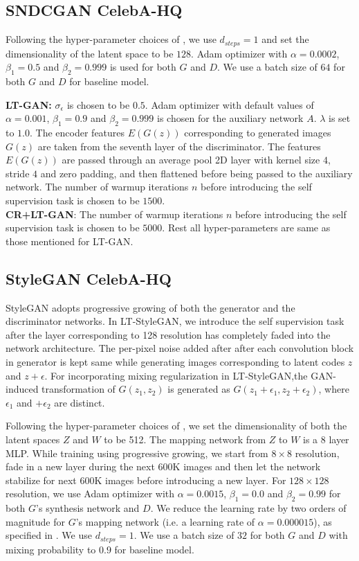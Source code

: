 \documentclass[10pt,twocolumn,letterpaper]{article}
\begin{document}
\subsection{SNDCGAN CelebA-HQ} 
Following the hyper-parameter choices of \cite{crgan2019chen}, we use $d_{steps} = 1$ and set the dimensionality of the latent space to be $128$. Adam optimizer with $\alpha=0.0002$, $\beta_1=0.5$ and $\beta_2=0.999$ is used for both $G$ and $D$. We use a batch size of $ 64$ for both $G$ and $D$ for baseline model.




\textbf{LT-GAN:}
$\sigma_\epsilon$ is chosen to be $0.5$. Adam optimizer with default values of $\alpha=0.001$, $\beta_1=0.9$ and $\beta_2=0.999$ is chosen for the auxiliary network $A$. $\lambda$ is set to $1.0$. The encoder features $E(G(z))$ corresponding to generated images $G(z)$ are taken from the seventh layer of the discriminator. The features $E(G(z))$ are passed through an average pool 2D layer with kernel size $4$, stride $4$ and zero padding, and then flattened before being passed to the auxiliary network. The number of warmup iterations $n$ before introducing the self supervision task is chosen to be $1500$. \\

\vspace{-8pt}
\textbf{CR+LT-GAN}:
The number of warmup iterations $n$ before introducing the self supervision task is chosen to be $5000$. Rest all hyper-parameters are same as those mentioned for LT-GAN.


\subsection{StyleGAN CelebA-HQ}

StyleGAN adopts progressive growing of both the generator and the  discriminator networks. In LT-StyleGAN, we introduce the self supervision task after the layer corresponding to 128 resolution has completely faded into the network architecture. The per-pixel noise added after after each convolution block in generator is kept same while generating images corresponding to latent codes $z$ and $z+\epsilon$. For incorporating mixing regularization in LT-StyleGAN,the GAN-induced transformation of $G(z_1, z_2)$ is generated as $G(z_1+\epsilon_1, z_2+\epsilon_2)$, where $\epsilon_1$ and $+\epsilon_2$ are distinct.


Following the hyper-parameter choices of \cite{stylegan2019karras}, we set the dimensionality of both the latent spaces $Z$ and $W$ to be 512. The mapping network from $Z$ to $W$ is a 8 layer MLP. While training using progressive growing, we start from $8\times8$ resolution, fade in a new layer during the next 600K images and then let the network stabilize for next 600K images before introducing a new layer. For $128\times128$ resolution, we use Adam optimizer with $\alpha=0.0015$, $\beta_1=0.0$ and $\beta_2=0.99$ for both $G$'s synthesis network and $D$. We reduce the learning rate by two orders of magnitude for $G$'s mapping network (i.e. a learning rate of $\alpha=0.000015$), as specified in \cite{stylegan2019karras}. We use $d_{steps}=1$. We use a batch size of $32$ for both $G$ and $D$ with mixing probability to $0.9$ for baseline model.
\end{document}
